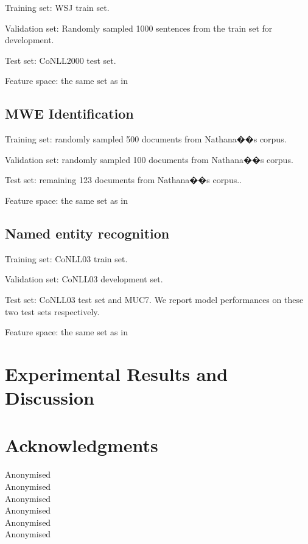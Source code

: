 \documentclass[11pt]{article}
\begin{document}
\noindent
Training set: WSJ train set.

\noindent
Validation set: Randomly sampled 1000 sentences from the train set for development.

\noindent
Test set: CoNLL2000 test set.

\noindent
Feature space: the same set as in~\cite{turian2010word}

\subsection{MWE Identification}
Training set: randomly sampled 500 documents from Nathana��s corpus.

\noindent
Validation set: randomly sampled 100 documents from Nathana��s corpus.

\noindent
Test set: remaining 123 documents from Nathana��s corpus..

\noindent
Feature space: the same set as in~\cite{mwecorpus}


\subsection{Named entity recognition}
Training set: CoNLL03 train set.

\noindent
Validation set: CoNLL03 development set.

\noindent
Test set: CoNLL03 test set and MUC7. We report model performances on these two test sets respectively.

\noindent
Feature space: the same set as in~\cite{turian2010word}

\section{Experimental Results and Discussion}

\section*{Acknowledgments}

Anonymised\\
Anonymised\\
Anonymised\\
Anonymised\\
Anonymised\\
Anonymised\\




\end{document}
